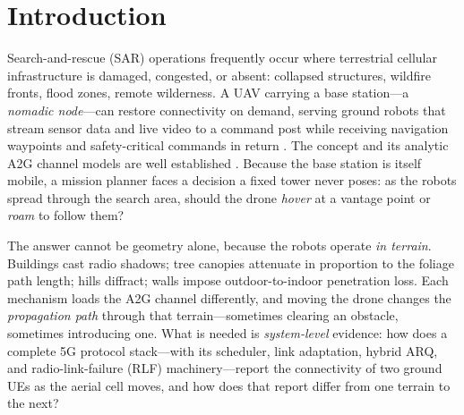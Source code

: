 \documentclass[10pt, conference]{IEEEtran}
\begin{document}
\section{Introduction}
Search-and-rescue (SAR) operations frequently occur where terrestrial cellular
infrastructure is damaged, congested, or absent: collapsed structures, wildfire
fronts, flood zones, remote wilderness. A UAV carrying a base station---a
\emph{nomadic node}---can restore connectivity on demand, serving ground robots
that stream sensor data and live video to a command post while receiving
navigation waypoints and safety-critical commands in return
\cite{zeng2016wireless, zeng2019accessing, mozaffari2019tutorial}. The concept and
its analytic A2G channel models are well established
\cite{alhourani2014optimal, 3gpp36777}. Because the base station is itself mobile,
a mission planner faces a decision a fixed tower never poses: as the robots spread
through the search area, should the drone \emph{hover} at a vantage point or
\emph{roam} to follow them?

The answer cannot be geometry alone, because the robots operate \emph{in terrain}.
Buildings cast radio shadows; tree canopies attenuate in proportion to the foliage
path length; hills diffract; walls impose outdoor-to-indoor penetration loss. Each
mechanism loads the A2G channel differently, and moving the drone changes the
\emph{propagation path} through that terrain---sometimes clearing an obstacle,
sometimes introducing one. What is needed is \emph{system-level} evidence: how
does a complete 5G protocol stack---with its scheduler, link adaptation, hybrid
ARQ, and radio-link-failure (RLF) machinery---report the connectivity of two
ground UEs as the aerial cell moves, and how does that report differ from one
terrain to the next?
\end{document}
